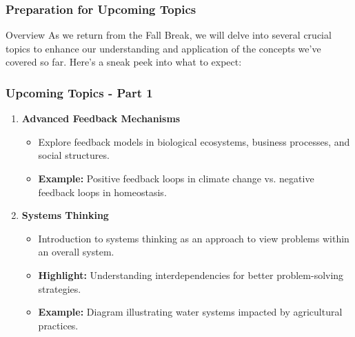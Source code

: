 \documentclass[aspectratio=169]{beamer}
\begin{document}
\begin{frame}[fragile]
    \frametitle{Preparation for Upcoming Topics}
    \begin{block}{Overview}
        As we return from the Fall Break, we will delve into several crucial topics to enhance our understanding and application of the concepts we've covered so far. Here's a sneak peek into what to expect:
    \end{block}
\end{frame}

\begin{frame}[fragile]
    \frametitle{Upcoming Topics - Part 1}
    \begin{enumerate}
        \item \textbf{Advanced Feedback Mechanisms}
            \begin{itemize}
                \item Explore feedback models in biological ecosystems, business processes, and social structures.
                \item \textbf{Example:} Positive feedback loops in climate change vs. negative feedback loops in homeostasis.
            \end{itemize}
        
        \item \textbf{Systems Thinking}
            \begin{itemize}
                \item Introduction to systems thinking as an approach to view problems within an overall system.
                \item \textbf{Highlight:} Understanding interdependencies for better problem-solving strategies.
                \item \textbf{Example:} Diagram illustrating water systems impacted by agricultural practices.
            \end{itemize}
    \end{enumerate}
\end{frame}
\end{document}
